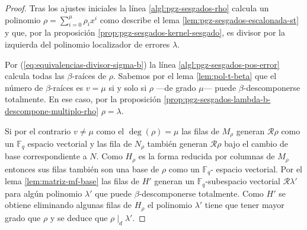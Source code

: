 \begin{proof}
  Tras los ajustes iniciales la línea \ref{algl:pgz-sesgados-rho} calcula un polinomio \(\rho = \sum_{i = 0}^{\mu}\rho_ix^{i}\) como describe el lema \ref{lem:pgz-sesgados-escalonada-st} y que, por la proposición \ref{prop:pgz-sesgados-kernel-sesgado}, es divisor por la izquierda del polinomio localizador de errores \(\lambda\).
  
  Por (\ref{eq:equivalencias-divisor-sigma-b}) la línea \ref{algl:pgz-sesgados-pos-error} calcula todas las \(\beta\)-raíces de \(\rho\).
  Sabemos por el lema \ref{lem:pol-t-beta} que el número de \(\beta\)-raíces es \(v = \mu\) si y solo si \(\rho\) —de grado \(\mu\)— puede \(\beta\)-descomponerse totalmente.
  En ese caso, por la proposición \ref{prop:pgz-sesgados-lambda-b-descompone-multiplo-rho} \(\rho = \lambda\).
  
  Si por el contrario \(v \neq \mu\) como el \(\deg(\rho) = \mu\) las filas de \(M_{\rho}\) generan \(\mathcal R\rho\) como un \(\mathbb F_q\) espacio vectorial y las fila de \(N_{\rho}\) también generan \(\mathcal R\rho\) bajo el cambio de base correspondiente a \(N\).
  Como \(H_{\rho}\) es la forma reducida por columnas de \(M_{\rho}\) entonces sus filas también son una base de \(\mathcal \rho\) como un \(\mathbb F_q\)- espacio vectorial.
  Por el lema \ref{lem:matriz-mf-base} las filas de \(H'\) generan un \(\mathbb F_q\)-subespacio vectorial \(\mathcal R\lambda'\) para algún polinomio \(\lambda'\) que puede \(\beta\)-descomponerse totalmente.
  Como \(H'\) se obtiene eliminando algunas filas de \(H_{\rho}\) el polinomio \(\lambda'\) tiene que tener mayor grado que \(\rho\) y se deduce que \(\rho \mid_d \lambda'\).


\end{proof}
